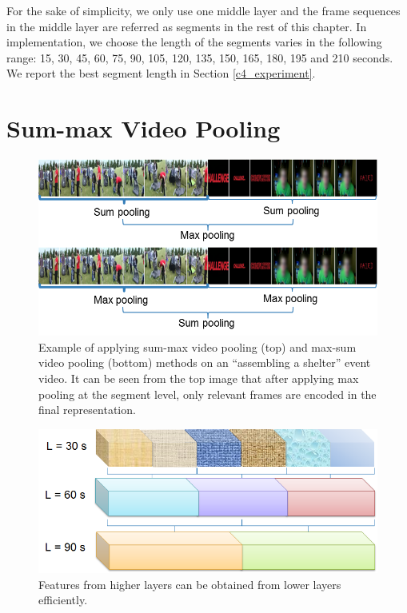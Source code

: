 For the sake of simplicity, we only use one middle layer and the frame sequences in the middle layer are referred as segments in the rest of this chapter. In implementation, we choose the length of the segments varies in the following range: 15, 30, 45, 60, 75, 90, 105, 120, 135, 150, 165, 180, 195 and 210 seconds. We report the best segment length in Section \ref{c4_experiment}.

\section{Sum-max Video Pooling} 
\label{sec:summax}
\begin{figure}
	\centering
	\includegraphics[width=1\textwidth]{summax_maxsum.png}
	\caption{Example of applying sum-max video pooling (top) and max-sum video pooling (bottom) methods on an ``assembling a shelter'' event video. It can be seen from the top image that after applying max pooling at the segment level, only relevant frames are encoded in the final representation.}
	\label{f_sum_max3}
\end{figure}

\begin{figure}
	\centering
	\includegraphics[width=1\textwidth]{efficient.png}
	\caption{Features from higher layers can be obtained from lower layers efficiently.}
	\label{f_efficient}
\end{figure}

